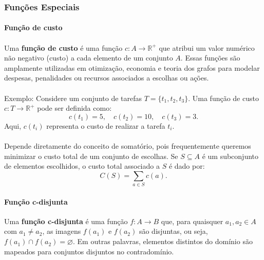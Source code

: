 \documentclass[12pt,a4paper]{article}
\begin{document}
\subsubsection{Funções Especiais}

\paragraph{Função de custo}
\paragraph{}Uma \textbf{função de custo} é uma função \(c: A \to \mathbb{R}^+\) que atribui um valor numérico não negativo (custo) a cada elemento de um conjunto \(A\). Essas funções são amplamente utilizadas em otimização, economia e teoria dos grafos para modelar despesas, penalidades ou recursos associados a escolhas ou ações.

\paragraph{}
Exemplo: Considere um conjunto de tarefas \(T = \{t_1, t_2, t_3\}\). Uma função de custo \(c: T \to \mathbb{R}^+\) pode ser definida como:
\[c(t_1) = 5, \quad c(t_2) = 10, \quad c(t_3) = 3.\]
Aqui, \(c(t_i)\) representa o custo de realizar a tarefa \(t_i\). 

\paragraph{}
Depende diretamente do conceito de somatório, pois frequentemente queremos minimizar o custo total de um conjunto de escolhas. Se \(S \subseteq A\) é um subconjunto de elementos escolhidos, o custo total associado a \(S\) é dado por:
\[C(S) = \sum_{a \in S} c(a).\] 

\paragraph{Função c-disjunta}
Uma \textbf{função c-disjunta} é uma função \(f: A \to B\) que, para quaisquer \(a_1, a_2 \in A\) com \(a_1 \neq a_2\), as imagens \(f(a_1)\) e \(f(a_2)\) são disjuntas, ou seja, \(f(a_1) \cap f(a_2) = \varnothing\). Em outras palavras, elementos distintos do domínio são mapeados para conjuntos disjuntos no contradomínio.
\end{document}
